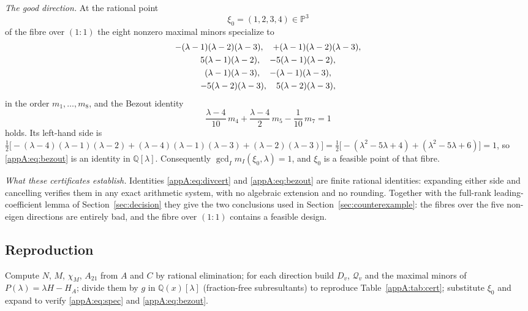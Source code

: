 \emph{The good direction.} At the rational point
\begin{equation}\label{appA:eq:xipoint}
\xi_0=(1,2,3,4)\in\mathbb P^3
\end{equation}
of the fibre over $(1\!:\!1)$ the eight nonzero maximal minors specialize to
\begin{gather}
-(\lambda-1)(\lambda-2)(\lambda-3),\quad +(\lambda-1)(\lambda-2)(\lambda-3),\notag\\
5(\lambda-1)(\lambda-2),\quad -5(\lambda-1)(\lambda-2),\notag\\
(\lambda-1)(\lambda-3),\quad -(\lambda-1)(\lambda-3),\notag\\
-5(\lambda-2)(\lambda-3),\quad 5(\lambda-2)(\lambda-3),\label{appA:eq:spec}
\end{gather}
in the order $m_1,\dots,m_8$, and the Bezout identity
\begin{equation}\label{appA:eq:bezout}
\frac{\lambda-4}{10}\,m_4+\frac{\lambda-4}{2}\,m_5-\frac{1}{10}\,m_7=1
\end{equation}
holds. Its left-hand side is
$\frac{1}{2}\bigl[-(\lambda-4)(\lambda-1)(\lambda-2)+(\lambda-4)(\lambda-1)(\lambda-3)+(\lambda-2)(\lambda-3)\bigr]
=\frac{1}{2}\bigl[-(\lambda^2-5\lambda+4)+(\lambda^2-5\lambda+6)\bigr]=1$,
so \eqref{appA:eq:bezout} is an identity in $\mathbb Q[\lambda]$. Consequently
$\gcd_I m_I(\xi_0,\lambda)=1$, and $\xi_0$ is a feasible point of that fibre.

\emph{What these certificates establish.} Identities \eqref{appA:eq:divcert} and
\eqref{appA:eq:bezout} are finite rational identities: expanding either side and cancelling verifies
them in any exact arithmetic system, with no algebraic extension and no rounding. Together with the
full-rank leading-coefficient lemma of Section~\ref{sec:decision} they give the two conclusions used in
Section~\ref{sec:counterexample}: the fibres over the five non-eigen directions are entirely bad, and
the fibre over $(1\!:\!1)$ contains a feasible design.
\subsection{Reproduction}
\label{appA:reproduction}
Compute $N$, $M$, $\chi_M$, $A_{21}$ from $A$ and $C$ by rational elimination; for each direction build
$D_v$, $\mathcal Q_v$ and the maximal minors of $P(\lambda)=\lambda H-H_A$; divide them by $g$ in
$\mathbb Q(x)[\lambda]$ (fraction-free subresultants) to reproduce Table~\ref{appA:tab:cert}; substitute
$\xi_0$ and expand to verify \eqref{appA:eq:spec} and \eqref{appA:eq:bezout}.
